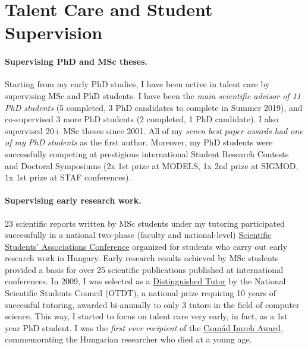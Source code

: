 \documentclass[a4paper,11pt]{article}
\begin{document}





\section{Talent Care and Student Supervision}
\paragraph{Supervising PhD and MSc theses.}
Starting from my early PhD studies, I have been active in talent care by supervising MSc and PhD students. I have been the \emph{main scientific advisor of 11 PhD students} (5 completed, 3 PhD candidates to complete in Summer 2019), and co-supervised 3 more PhD students (2 completed, 1 PhD candidate). I also supervised 20+ MSc theses since 2001. All of my \emph{seven best paper awards had one of my PhD students} as the first author. Moreover, my PhD students were successfully competing at prestigious international Student Research Contests and Doctoral Symposiums (2x 1st prize at MODELS, 1x 2nd prize at SIGMOD, 1x 1st prize at STAF conferences).

\paragraph{Supervising early research work.} 
23 scientific reports written by MSc students under my tutoring participated successfully in a national two-phase (faculty and national-level) \href{http://www.otdt.hu/hu/cms/otdk/orszagos-tudomanyos-diakkori-konferencia/}{Scientific Students’ Associations Conference} organized for students who carry out early research work in Hungary. Early research results achieved by MSc students provided a basis for over 25 scientific publications published at international conferences. In 2009, I was selected as a \href{http://www.otdt.hu/page/kituntetesek/mak2009.php}{Distinguished Tutor} by the National Scientific Students Council (OTDT), a national prize requiring 10 years of successful tutoring, awarded bi-annually to only 3 tutors in the field of computer science. This way, I started to focus on talent care very early, in fact, as a 1st year PhD student. I was the \emph{first ever recipient} of the \href{https://otdk2017.mik.uni-pannon.hu/index.php/eredmenyek}{Csanád Imreh Award}, commemorating the Hungarian researcher who died %
at a young age. 
\end{document}
